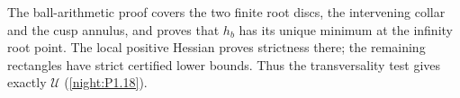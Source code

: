 \item The ball-arithmetic proof covers the two finite root discs,
  the intervening collar and the cusp annulus, and proves that $h_b$
  has its unique minimum at the infinity root point.  The local
  positive Hessian proves strictness there; the remaining rectangles
  have strict certified lower bounds.  Thus the transversality test
  gives exactly $\mathcal U$ (\cref{night:P1.18}).
